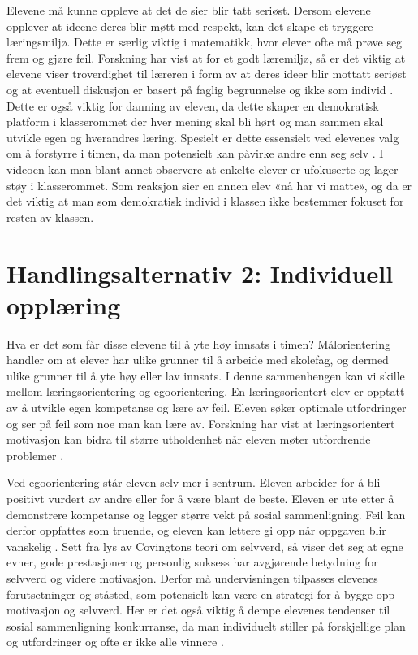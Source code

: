 \documentclass[12pt,a4paper]{article}
\begin{document}
Elevene må kunne oppleve at det de sier blir tatt seriøst. Dersom elevene opplever at ideene deres blir møtt med respekt, kan det skape et tryggere læringsmiljø. Dette er særlig viktig i matematikk, hvor elever ofte må prøve seg frem og gjøre feil.
Forskning har vist at for et godt læremiljø, så er det viktig at elevene viser troverdighet til læreren i form av at deres ideer blir mottatt seriøst og at eventuell diskusjon er basert på faglig begrunnelse og ikke som individ \parencite{ucar}.
Dette er også viktig for danning av eleven, da dette skaper en demokratisk platform i klasserommet der hver mening skal bli hørt og man sammen skal utvikle egen og hverandres læring. 
Spesielt er dette essensielt ved elevenes valg om å forstyrre i timen, da man potensielt kan påvirke andre enn seg selv \parencite{werler2024}. I videoen kan man blant annet observere at enkelte elever er ufokuserte og lager støy i klasserommet. Som reaksjon sier en annen elev «nå har vi matte», og da er det viktig at man som demokratisk individ i klassen ikke bestemmer fokuset for resten av klassen.
  



\section*{Handlingsalternativ 2: Individuell opplæring}
Hva er det som får disse elevene til å yte høy innsats i timen? Målorientering handler om at elever har ulike grunner til å arbeide med skolefag, og dermed ulike grunner til å yte høy eller lav innsats. I denne sammenhengen kan vi skille mellom læringsorientering og egoorientering. En læringsorientert elev er opptatt av å utvikle egen kompetanse og lære av feil. Eleven søker optimale utfordringer og ser på feil som noe man kan lære av. Forskning har vist at læringsorientert motivasjon kan bidra til større utholdenhet når eleven møter utfordrende problemer \parencite{skaalvik2026}.

Ved egoorientering står eleven selv mer i sentrum. Eleven arbeider for å bli positivt vurdert av andre eller for å være blant de beste. Eleven er ute etter å demonstrere kompetanse og legger større vekt på sosial sammenligning. Feil kan derfor
oppfattes som truende, og eleven kan lettere gi opp når oppgaven blir vanskelig \parencite{skaalvik2026}. Sett fra lys av Covingtons teori om selvverd, så viser det seg at egne evner, gode prestasjoner og personlig suksess har avgjørende betydning
for selvverd og videre motivasjon. Derfor må undervisningen tilpasses elevenes forutsetninger og ståsted, som potensielt kan være en strategi for å bygge opp motivasjon og selvverd. Her er det også viktig å dempe
elevenes tendenser til sosial sammenligning konkurranse, da man individuelt stiller på forskjellige plan og utfordringer og ofte er ikke alle vinnere \parencite{skaalvik2021skolen}.   
\end{document}
